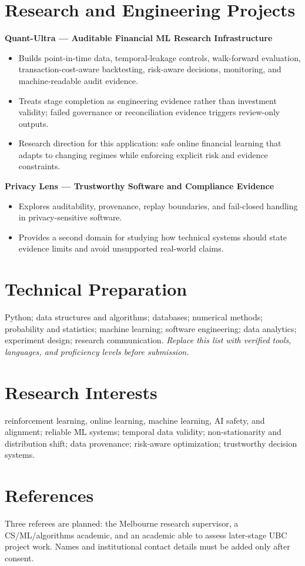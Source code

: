 \documentclass[11pt]{article}
\begin{document}
\section*{Research and Engineering Projects}
\textbf{Quant-Ultra --- Auditable Financial ML Research Infrastructure}
\begin{itemize}
\item Builds point-in-time data, temporal-leakage controls, walk-forward evaluation, transaction-cost-aware backtesting, risk-aware decisions, monitoring, and machine-readable audit evidence.
\item Treats stage completion as engineering evidence rather than investment validity; failed governance or reconciliation evidence triggers review-only outputs.
\item Research direction for this application: safe online financial learning that adapts to changing regimes while enforcing explicit risk and evidence constraints.
\end{itemize}

\begin{samepage}
\textbf{Privacy Lens --- Trustworthy Software and Compliance Evidence}
\begin{itemize}
\item Explores auditability, provenance, replay boundaries, and fail-closed handling in privacy-sensitive software.
\item Provides a second domain for studying how technical systems should state evidence limits and avoid unsupported real-world claims.
\end{itemize}
\end{samepage}

\section*{Technical Preparation}
Python; data structures and algorithms; databases; numerical methods; probability and statistics; machine learning; software engineering; data analytics; experiment design; research communication. \textit{Replace this list with verified tools, languages, and proficiency levels before submission.}

\section*{Research Interests}
reinforcement learning, online learning, machine learning, AI safety, and alignment; reliable ML systems; temporal data validity; non-stationarity and distribution shift; data provenance; risk-aware optimization; trustworthy decision systems.

\section*{References}
Three referees are planned: the Melbourne research supervisor, a CS/ML/algorithms academic, and an academic able to assess later-stage UBC project work. Names and institutional contact details must be added only after consent.
\end{document}
